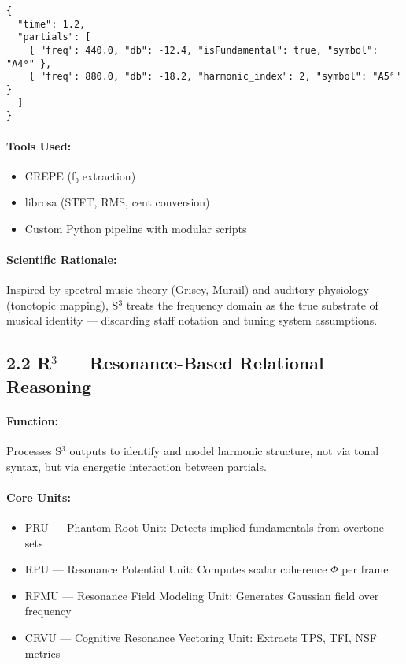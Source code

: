 \begin{verbatim}
{
  "time": 1.2,
  "partials": [
    { "freq": 440.0, "db": -12.4, "isFundamental": true, "symbol": "A4⁰" },
    { "freq": 880.0, "db": -18.2, "harmonic_index": 2, "symbol": "A5⁰" }
  ]
}
\end{verbatim}

\paragraph{Tools Used:}

\begin{itemize}
  \item CREPE (f₀ extraction)
  \item librosa (STFT, RMS, cent conversion)
  \item Custom Python pipeline with modular scripts
\end{itemize}

\paragraph{Scientific Rationale:}  
Inspired by spectral music theory (Grisey, Murail) and auditory physiology (tonotopic mapping), S$^{3}$ treats the frequency domain as the true substrate of musical identity — discarding staff notation and tuning system assumptions.

\subsection*{2.2 R$^{3}$ — Resonance-Based Relational Reasoning}

\paragraph{Function:}  
Processes S$^{3}$ outputs to identify and model harmonic structure, not via tonal syntax, but via energetic interaction between partials.

\paragraph{Core Units:}

\begin{itemize}
  \item PRU — Phantom Root Unit: Detects implied fundamentals from overtone sets
  \item RPU — Resonance Potential Unit: Computes scalar coherence $\Phi$ per frame
  \item RFMU — Resonance Field Modeling Unit: Generates Gaussian field over frequency
  \item CRVU — Cognitive Resonance Vectoring Unit: Extracts TPS, TFI, NSF metrics
\end{itemize}

